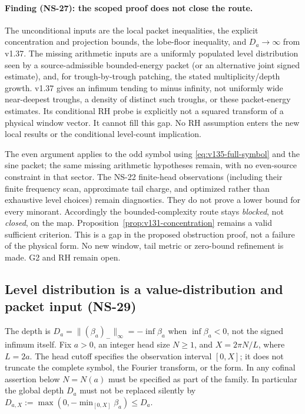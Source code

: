 \documentclass[11pt]{article}
\theoremstyle{remark}
\begin{document}
\paragraph{Finding (NS-27): the scoped proof does not close the route.}
The unconditional inputs are the local packet inequalities, the explicit
concentration and projection bounds, the lobe-floor inequality, and
$D_a\to\infty$ from v1.37. The missing arithmetic inputs are a
uniformly populated level distribution seen by a source-admissible
bounded-energy packet (or an alternative joint signed estimate), and,
for trough-by-trough patching, the stated multiplicity/depth growth.
v1.37 gives an infimum tending to minus infinity, not uniformly wide
near-deepest troughs, a density of distinct such troughs, or these
packet-energy estimates. Its conditional RH probe is explicitly not
a squared transform of a physical window vector. It cannot fill this
gap. No RH assumption enters the new local results or the conditional
level-count implication.

The even argument applies to the odd symbol using
\eqref{eq:v135-full-symbol} and the sine packet; the same missing
arithmetic hypotheses remain, with no even-source constraint in that
sector. The NS-22 finite-head observations (including their finite
frequency scan, approximate tail charge, and optimized rather than
exhaustive level choices) remain diagnostics. They do not prove a
lower bound for every minorant. Accordingly the bounded-complexity
route stays \emph{blocked}, not \emph{closed}, on the map.
Proposition~\ref{prop:v131-concentration} remains a valid sufficient
criterion. This is a gap in the proposed obstruction proof, not a
failure of the physical form. No new window, tail metric or zero-bound
refinement is made. G2 and RH remain open.

\subsection{Level distribution is a value-distribution and packet input (NS-29)}

The depth is $D_a=\| (\beta_a)_-\|_\infty=-\inf\beta_a$ when
$\inf\beta_a<0$, not the signed infimum itself. Fix $a>0$, an integer
head size $N\ge1$, and $X=2\pi N/L$, where $L=2a$. The head cutoff
specifies the observation interval $[0,X]$; it does not truncate the
complete symbol, the Fourier transform, or the form. In any cofinal
assertion below $N=N(a)$ must be specified as part of the family.
In particular the global depth $D_a$ must not be replaced silently by
$D_{a,X}:=\max(0,-\min_{[0,X]}\beta_a)\le D_a$.
\end{document}
